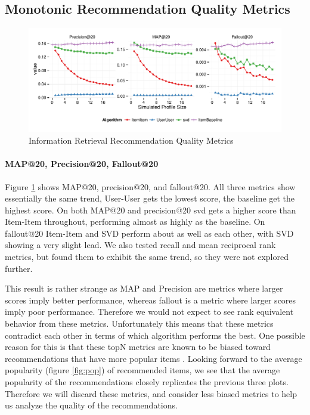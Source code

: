 \documentclass[letterpaper]{sig-alternate}
\begin{document}


\subsection {Monotonic Recommendation Quality Metrics}

\begin{figure}[ht!]
  \centering
  \includegraphics[width=\linewidth]{../lenskit/output/ekstrandTuned20/TopNPrecision.pdf}
  \caption{Information Retrieval Recommendation Quality Metrics}
  \label{fig:map}
\end{figure}
\paragraph{MAP@20, Precision@20, Fallout@20}
  Figure \ref{fig:map} shows MAP@20, precision@20, and fallout@20.
  All three metrics show essentially the same trend, User-User gets the lowest score, the baseline get the highest score.
  On both MAP@20 and precision@20 svd gets a higher score than Item-Item throughout, performing almost as highly as the baseline.
  On fallout@20 Item-Item and SVD perform about as well as each other, with SVD showing a very slight lead.
  We also tested recall and mean reciprocal rank metrics, but found them to exhibit the same trend, so they were not explored further.

  This result is rather strange as MAP and Precision are metrics where larger scores imply better performance, whereas fallout is a metric where larger scores imply poor performance.
  Therefore we would not expect to see rank equivalent behavior from these metrics.
  Unfortunately this means that these metrics contradict each other in terms of which algorithm performs the best.
  One possible reason for this is that these topN metrics are known to be biased toward recommendations that have more popular items \cite{bellogin}.
  Looking forward to the average popularity (figure \ref{fig:pop}) of recommended items, we see that the average popularity of the recommendations closely replicates the previous three plots.
  Therefore we will discard these metrics, and consider less biased metrics to help us analyze the quality of the recommendations.
\end{document}
